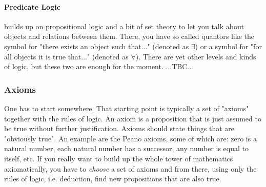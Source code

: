 


\paragraph{Predicate Logic} builds up on propositional logic and a bit of set theory to let you talk about objects and relations between them. There, you have so called quantors like the symbol for "there exists an object such that..." (denoted as $\exists$) or a symbol for "for all objects it is true that..." (denoted as $\forall$). There are yet other levels and kinds of logic, but these two are enough for the moment. ...TBC...


\subsubsection{Axioms}
One has to start somewhere. That starting point is typically a set of "axioms" together with the rules of logic. An axiom is a proposition that is just assumed to be true without further justification. Axioms should state things that are "obviously true". An example are the Peano axioms, some of which are: zero is a natural number, each natural number has a successor, any number is equal to itself, etc. If you really want to build up the whole tower of mathematics axiomatically, you have to \emph{choose} a set of axioms and from there, using only the rules of logic, i.e. deduction, find new propositions that are also true.

